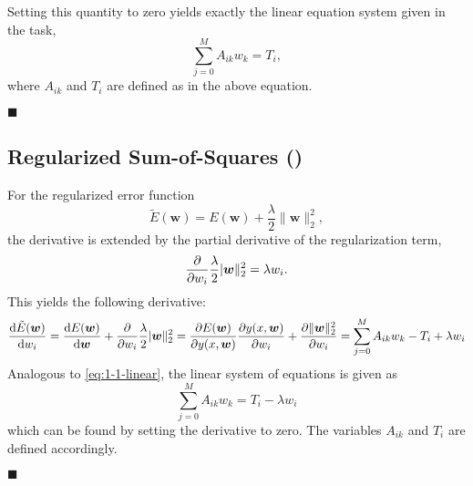 \documentclass[11pt, a4paper]{scrartcl}
\renewcommand{\vec}[1]{\bm{#1}}
\newcommand{\eot}{\hfill\(\blacksquare\)}
\newcommand{\diffstar}{\texorpdfstring{\raisebox{-1pt}{\resizebox{!}{8pt}{\(\star\)}}}{*}}
\newcommand{\onestar}  {(\diffstar)}
\begin{document}
			Setting this quantity to zero yields exactly the linear equation system given in the task,
			\begin{equation}
				\sum_{j = 0}^{M} A_{ik} w_k = T_i,  \label{eq:1-1-linear}
			\end{equation}
			where \(A_{ik}\) and \(T_i\) are defined as in the above equation.

			\eot

		\subsection{Regularized Sum-of-Squares  \onestar}
			For the regularized error function
			\begin{equation}
				\tilde{E}(\vec{w}) = E(\vec{w}) + \frac{\lambda}{2} \lVert \vec{w} \rVert_2^2,
			\end{equation}
			the derivative is extended by the partial derivative of the regularization term,
			\begin{equation}
				\pdv{w_i} \frac{\lambda}{2} \lvert \vec{w} \rVert_2^2 = \lambda w_i.
			\end{equation}
			This yields the following derivative:
			\begin{equation}
				\dv{\tilde{E}(\vec{w})}{w_i}
					= \dv{E(\vec{w})}{\vec{w}} + \pdv{w_i} \frac{\lambda}{2} \lvert \vec{w} \rVert_2^2
					= \pdv{E(\vec{w})}{y(x, \vec{w})} \pdv{y(x, \vec{w})}{w_i} + \pdv{\lVert \vec{w} \rVert_2^2}{w_i}
					= \sum_{j = 0}^{M} A_{ik} w_k - T_i + \lambda w_i
			\end{equation}
			Analogous to \eqref{eq:1-1-linear}, the linear system of equations is given as
			\begin{equation}
				\sum_{j = 0}^{M} A_{ik} w_k = T_i - \lambda w_i
			\end{equation}
			which can be found by setting the derivative to zero. The variables \(A_{ik}\) and \(T_i\) are defined accordingly.

			\eot
\end{document}
